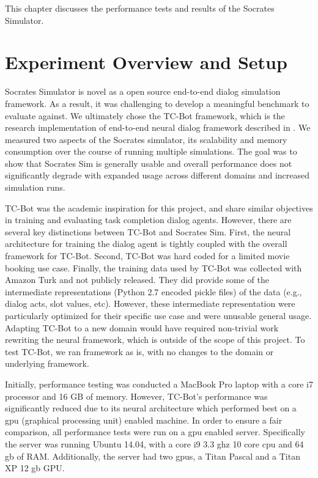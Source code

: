 This chapter discusses the performance tests and results of the Socrates Simulator.

\section{Experiment Overview and Setup}

 Socrates Simulator is novel as a open source end-to-end dialog simulation framework. As a result, it was challenging to develop a meaningful benchmark to evaluate against. We ultimately chose the TC-Bot framework, which is the research implementation of end-to-end neural dialog framework described in \cite{li_end_to_end}. We measured two aspects of the Socrates simulator, its scalability and memory consumption over the course of running multiple simulations. The goal was to show that Socrates Sim is generally usable and overall performance does not significantly degrade with expanded usage across different domains and increased simulation runs. 
 
 TC-Bot was the academic inspiration for this project, and share similar objectives in training and evaluating task completion dialog agents. However, there are several key distinctions between TC-Bot and Socrates Sim. First, the neural architecture for training the dialog agent is tightly coupled with the overall framework for TC-Bot. Second, TC-Bot was hard coded for a limited movie booking use case. Finally, the training data used by TC-Bot was collected with Amazon Turk and not publicly released. They did provide some of the intermediate representations (Python 2.7 encoded pickle files) of the data (e.g., dialog acts, slot values, etc). However, these intermediate representation were particularly optimized for their specific use case and were unusable general usage. Adapting TC-Bot to a new domain would have required non-trivial work rewriting the neural framework, which is outside of the scope of this project. To test TC-Bot, we ran framework as is, with no changes to the domain or underlying framework. 

Initially, performance testing was conducted a MacBook Pro laptop with a core i7 processor and 16 GB of memory. However, TC-Bot's performance was significantly reduced due to its neural architecture which performed best on a gpu (graphical processing unit) enabled machine. In order to ensure a fair comparison, all performance tests were run on a gpu enabled server. Specifically the server was running Ubuntu 14.04, with a core i9 3.3 ghz 10 core cpu and  64 gb of RAM. Additionally, the server had two gpus, a Titan Pascal and a Titan XP 12 gb GPU. 

